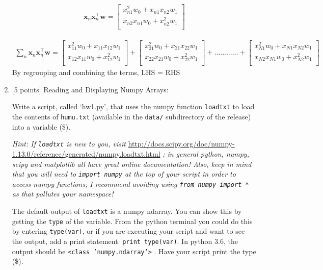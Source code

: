 \documentclass[10pt]{article}
\begin{document}
\begin{enumerate}
\begin{eqnarray*}
\mathbf{x}_n \mathbf{x}_n^\top \mathbf{w}= 
    \begin{bmatrix}
   	x_{n1}^2w_0 + x_{n1}x_{n2}w_1 \\[0.3em]
    x_{n2}x_{n1}w_0 +  x_{n2}^2w_1\\[0.3em]
    \end{bmatrix}
    \end{eqnarray*} 

\begin{eqnarray*}
\sum_{n} \mathbf{x}_n \mathbf{x}_n ^\top \mathbf{w} =
\begin{bmatrix}
   	x_{11}^2w_0 + x_{11}x_{12}w_1 \\[0.3em]
    x_{12}x_{11}w_0 +  x_{12}^2w_1\\[0.3em]
    \end{bmatrix} +
    \begin{bmatrix}
   	x_{21}^2w_0 + x_{21}x_{22}w_1 \\[0.3em]
    x_{22}x_{21}w_0 +  x_{22}^2w_1\\[0.3em]
    \end{bmatrix}+ ............+
    \begin{bmatrix}
   	x_{N1}^2w_0 + x_{N1}x_{N2}w_1 \\[0.3em]
    x_{N2}x_{N1}w_0 +  x_{N2}^2w_1\\[0.3em]
    \end{bmatrix}
\end{eqnarray*}
By regrouping and combining the terms, LHS = RHS


\newpage
\item \label{prob:6} [5 points]
Reading and Displaying Numpy Arrays:

Write a script, called `hw1.py', that uses the numpy function {\tt loadtxt} to load the contents of {\tt humu.txt} (available in the {\tt data/} subdirectory of the release) into a variable (\$).

{\em Hint: If {\tt loadtxt} is new to you, visit} \url{http://docs.scipy.org/doc/numpy-1.13.0/reference/generated/numpy.loadtxt.html} {\em ; in general python, numpy, scipy and matplotlib all have great online documentation!  Also, keep in mind that you will need to {\tt import numpy} at the top of your script in order to access numpy functions; I recommend avoiding using {\tt from numpy import *} as that pollutes your namespace! }

The default output of {\tt loadtxt} is a numpy ndarray.  You can show this by getting the {\tt type} of the variable.  From the python terminal you could do this by entering {\tt type(var)}, or if you are executing your script and want to see the output, add a print statement: {\tt print type(var)}.  In python 3.6, the output should be {\tt <class 'numpy.ndarray'>} .  Have your script print the type (\$).


\end{enumerate}
\end{document}

